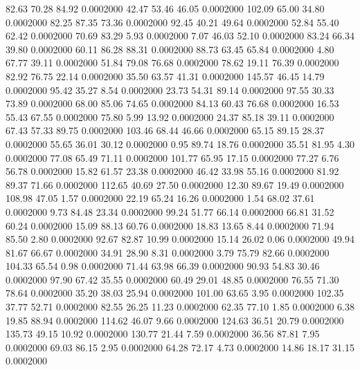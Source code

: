  82.63   70.28   84.92   0.0002000
  42.47   53.46   46.05   0.0002000
 102.09   65.00   34.80   0.0002000
  82.25   87.35   73.36   0.0002000
  92.45   40.21   49.64   0.0002000
  52.84   55.40   62.42   0.0002000
  70.69   83.29    5.93   0.0002000
   7.07   46.03   52.10   0.0002000
  83.24   66.34   39.80   0.0002000
  60.11   86.28   88.31   0.0002000
  88.73   63.45   65.84   0.0002000
   4.80   67.77   39.11   0.0002000
  51.84   79.08   76.68   0.0002000
  78.62   19.11   76.39   0.0002000
  82.92   76.75   22.14   0.0002000
  35.50   63.57   41.31   0.0002000
 145.57   46.45   14.79   0.0002000
  95.42   35.27    8.54   0.0002000
  23.73   54.31   89.14   0.0002000
  97.55   30.33   73.89   0.0002000
  68.00   85.06   74.65   0.0002000
  84.13   60.43   76.68   0.0002000
  16.53   55.43   67.55   0.0002000
  75.80    5.99   13.92   0.0002000
  24.37   85.18   39.11   0.0002000
  67.43   57.33   89.75   0.0002000
 103.46   68.44   46.66   0.0002000
  65.15   89.15   28.37   0.0002000
  55.65   36.01   30.12   0.0002000
   0.95   89.74   18.76   0.0002000
  35.51   81.95    4.30   0.0002000
  77.08   65.49   71.11   0.0002000
 101.77   65.95   17.15   0.0002000
  77.27    6.76   56.78   0.0002000
  15.82   61.57   23.38   0.0002000
  46.42   33.98   55.16   0.0002000
  81.92   89.37   71.66   0.0002000
 112.65   40.69   27.50   0.0002000
  12.30   89.67   19.49   0.0002000
 108.98   47.05    1.57   0.0002000
  22.19   65.24   16.26   0.0002000
   1.54   68.02   37.61   0.0002000
   9.73   84.48   23.34   0.0002000
  99.24   51.77   66.14   0.0002000
  66.81   31.52   60.24   0.0002000
  15.09   88.13   60.76   0.0002000
  18.83   13.65    8.44   0.0002000
  71.94   85.50    2.80   0.0002000
  92.67   82.87   10.99   0.0002000
  15.14   26.02    0.06   0.0002000
  49.94   81.67   66.67   0.0002000
  34.91   28.90    8.31   0.0002000
   3.79   75.79   82.66   0.0002000
 104.33   65.54    0.98   0.0002000
  71.44   63.98   66.39   0.0002000
  90.93   54.83   30.46   0.0002000
  97.90   67.42   35.55   0.0002000
  60.49   29.01   48.85   0.0002000
  76.55   71.30   78.64   0.0002000
  35.20   38.03   25.94   0.0002000
 101.00   63.65    3.95   0.0002000
 102.35   37.77   52.71   0.0002000
  82.55   26.25   11.23   0.0002000
  62.35   77.10    1.85   0.0002000
   6.38   19.85   88.94   0.0002000
 114.62   46.07    9.66   0.0002000
 124.63   36.51   20.79   0.0002000
 135.73   49.15   10.92   0.0002000
 130.77   21.44    7.59   0.0002000
  36.56   87.81    7.95   0.0002000
  69.03   86.15    2.95   0.0002000
  64.28   72.17    4.73   0.0002000
  14.86   18.17   31.15   0.0002000
